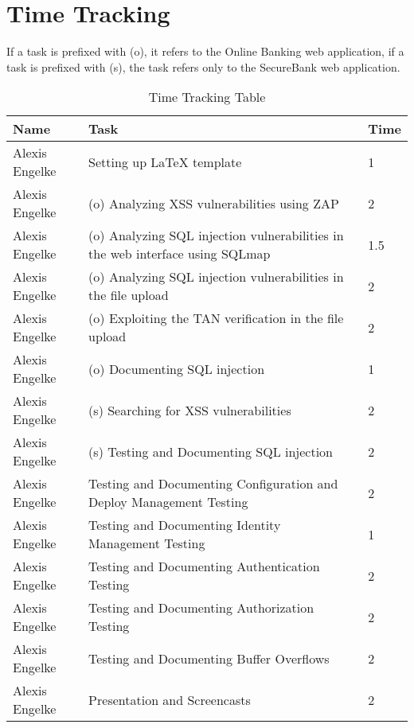 \chapter{Time Tracking}\label{chapter:times}

If a task is prefixed with (o), it refers to the Online Banking web application, if a task is prefixed with (s), the task refers only to the SecureBank web application.

\begin{table}[htpb]
  \caption[Time Tracking Table]{Time Tracking Table}\label{tab:times}
  \centering
  \begin{tabular}{l p{8cm} l}
    \toprule
      Name & Task & Time \\
    \midrule
      Alexis Engelke & Setting up LaTeX template & 1 \\
      Alexis Engelke & (o) Analyzing XSS vulnerabilities using ZAP & 2 \\
      Alexis Engelke & (o) Analyzing SQL injection vulnerabilities in the web interface using SQLmap & 1.5 \\
      Alexis Engelke & (o) Analyzing SQL injection vulnerabilities in the file upload & 2 \\
      Alexis Engelke & (o) Exploiting the TAN verification in the file upload & 2 \\
      Alexis Engelke & (o) Documenting SQL injection & 1 \\
      Alexis Engelke & (s) Searching for XSS vulnerabilities & 2 \\
      Alexis Engelke & (s) Testing and Documenting SQL injection & 2 \\
      Alexis Engelke & Testing and Documenting Configuration and Deploy Management Testing & 2 \\
      Alexis Engelke & Testing and Documenting Identity Management Testing & 1 \\
      Alexis Engelke & Testing and Documenting Authentication Testing & 2 \\
      Alexis Engelke & Testing and Documenting Authorization Testing & 2 \\
      Alexis Engelke & Testing and Documenting Buffer Overflows & 2 \\
      Alexis Engelke & Presentation and Screencasts & 2 \\
    \bottomrule
  \end{tabular}
\end{table}
